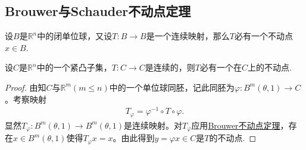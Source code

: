 \documentclass[../../main.tex]{subfiles}%
\begin{document}
\subsection{Brouwer与Schauder不动点定理}

\begin{theorem}[Brouwer不动点定理]\label{theorem:泛函分析---Brouwer不动点定理}
设$B$是$\mathbb{R}^n$中的闭单位球，又设$T: B \to B$是一个连续映射，那么$T$必有一个不动点$x \in B$.
\end{theorem}

\begin{corollary}\label{corollary:泛函分析--推论1.5.14}
设$C$是$\mathbb{R}^n$中的一个紧凸子集，$T: C \to C$是连续的，则$T$必有一个在$C$上的不动点.
\end{corollary}
\begin{proof}
由知$C$与$\mathbb{R}^m(m \leqslant n)$中的一个单位球同胚，记此同胚为$\varphi: B^m(\theta, 1) \to C$。考察映射
\begin{align*}
T_\varphi = \varphi^{-1} \circ T \circ \varphi.
\end{align*}
显然$T_\varphi: B^m(\theta, 1) \to B^m(\theta, 1)$是连续映射。对$T_\varphi$应用\hyperref[theorem:泛函分析---Brouwer不动点定理]{Brouwer不动点定理}，存在$x \in B^m(\theta, 1)$使得$T_\varphi x = x$。由此得到$y = \varphi x \in C$是$T$的不动点.
\end{proof}
\end{document}
